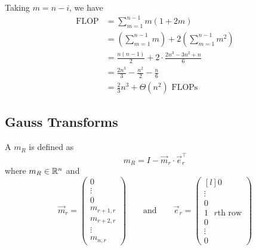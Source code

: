 Taking \( m = n - i \), we have
\begin{align*}
    \operatorname{FLOP}
     &
    = \sum_{m=1}^{n-1} m (1 + 2m)
    \\
     &
    = \left( \sum_{m=1}^{n-1} m \right) + 2 \left( \sum_{m=1}^{n-1} m^2 \right)
    \\
     &
    = \frac{n(n-1)}{2} + 2 \cdot \frac{2n^3 - 3n^2 + n}{6}
    \\
     &
    = \frac{2n^3}{3} - \frac{n^2}{2} - \frac{n}{6}
    \\
     & = \frac{2}{3} n^3 + \Theta(n^2) \text{ FLOPs}
\end{align*}

\subsection{Gauss Transforms}

\begin{definition}
    A  \( m_R \) is defined as \[
        m_R = I - \vec{m}_r \cdot \vec{e}_r^\top
    \] where \( m_R \in \mathbb{R}^n \) and \[
        \vec{m}_r = \begin{pmatrix}
            0 \\ \vdots \\ 0 \\ m_{r+1,r} \\ m_{r+2,r} \\ \vdots \\ m_{n,r}
        \end{pmatrix}
        \qquad \text{and} \qquad
        \vec{e}_r = \begin{pmatrix}[l]
            0 \\ \vdots \\ 0 \\ 1 \text{ \(r\)th row} \\ 0 \\ \vdots \\ 0
        \end{pmatrix}
    \]
\end{definition}

